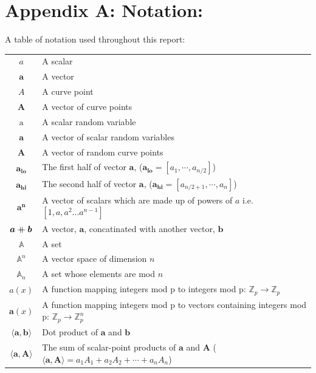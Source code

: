\documentclass{article}
\renewcommand{\vec}[1]{\boldsymbol{#1}}
\newcommand{\ran}[1]{\mathrm{#1}}
\newcommand{\vecran}[1]{\mathbf{#1}}
\newcommand{\Z}{\mathbb{Z}}
\newcommand\concat{\mathbin{+\mkern-10mu+}} %
\newcommand{\dotp}[2]{\langle #1, #2 \rangle}
\newcommand{\opn}[1]{\operatorname{#1}}
\newcommand{\veclo}[1]{\vec{#1_{\opn{lo}}}}
\newcommand{\vechi}[1]{\vec{#1_{\opn{hi}}}}
\begin{document}
\section{Appendix A: Notation:} \label{notation}

A table of notation used throughout this report:

\begin{center}
\begin{tabular}{ c l }
	$a$                         & A scalar \\
	$\vec{a}$                   & A vector \\
	$A$                         & A curve point \\
	$\vec{A}$                   & A vector of curve points \\
	$\ran{a}$                   & A scalar random variable \\
	$\vecran{a}$                & A vector of scalar random variables \\
	$\vecran{A}$                & A vector of random curve points \\
	$\veclo{a}$                 & The first half of vector $\vec{a}$, ($\veclo{a} = [a_{1}, \cdots, a_{n/2}]$) \\
	$\vechi{a}$                 & The second half of vector $\vec{a}$, ($\vechi{a} = [a_{n/2+1}, \cdots, a_{n}]$) \\
	$\vec{a^n}$                 & A vector of scalars which are made up of powers of $a$ i.e. $[1,a,a^2... a^{n-1}]$\\
	$\vec{a} \concat \vec{b}$   & A vector, $\vec{a}$, concatinated with another vector, $\vec{b}$\\
	$\mathbb{A}$                & A set \\
	$\mathbb{A}^n$              & A vector space of dimension $n$ \\ 
	$\mathbb{A}_n$              & A set whose elements are mod $n$ \\ 
	$a(x)$                      & A function mapping integers mod p to integers mod p: $\Z_p \rightarrow \Z_p$ \\
	$\vec{a}(x)$                & A function mapping integers mod p to vectors containing integers mod p: $\Z_p \rightarrow \Z^n_p$ \\
	$\dotp{\vec{a}}{\vec{b}}$   & Dot product of $\vec{a}$ and $\vec{b}$ \\
	$\dotp{\vec{a}}{\vec{A}}$   & The sum of scalar-point products of $\vec{a}$ and $\vec{A}$ ($\dotp{\vec{a}}{\vec{A}} = a_1 A_1 + a_2 A_2 + \cdots + a_n A_n$) \\
\end{tabular}
\end{center}
\end{document}
